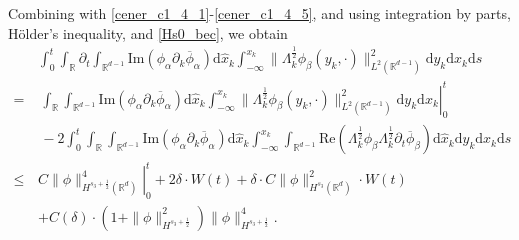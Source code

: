 \documentclass[10pt,twoside,a4paper]{article}
\numberwithin{equation}{section}\allowdisplaybreaks
\def\leq{\leqslant}
\begin{document}
Combining with \eqref{cener_c1_4_1}-\eqref{cener_c1_4_5}, and using integration by parts, Hölder's inequality, and \eqref{Hs0_bec}, we obtain
\begin{align} \label{cener_c1_4}
	&		 \int_0^t\int_{\mathbb{R}}  \partial_t\int_{\mathbb{R}^{d-1}}  \mathrm{Im}\left( \phi_{\alpha } \partial_k \overline{\phi}_\alpha \right) \mathrm{d} \hat{x}_k \int_{-\infty}^{x_k} \|\Lambda_k^{\frac 12}\phi_{\beta}(y_k,\cdot)\|^2_{L^2(\mathbb{R}^{d-1})}\mathrm{d} y_k  \mathrm{d} x_k \mathrm{d} s\nonumber\\
	=&\, \left. \int_{\mathbb{R}} \int_{\mathbb{R}^{d-1}}  \mathrm{Im}\left( \phi_{\alpha } \partial_k \overline{\phi}_\alpha \right) \mathrm{d} \hat{x}_k \int_{-\infty}^{x_k} \|\Lambda_k^{\frac 12}\phi_{\beta}(y_k,\cdot)\|^2_{L^2(\mathbb{R}^{d-1})}\mathrm{d} y_k  \mathrm{d} x_k \right|_{0}^t\nonumber\\
	&\,-2\int_0^t \int_{\mathbb{R}}  \int_{\mathbb{R}^{d-1}}  \mathrm{Im}\left( \phi_{\alpha } \partial_k \overline{\phi}_\alpha \right) \mathrm{d} \hat{x}_k \int_{-\infty}^{x_k} \int_{\mathbb{R}^{d-1}}  \mathrm{Re}\left( \Lambda_k^{\frac 12}\phi_{\beta}\Lambda_k^{\frac 12}\partial_t\overline{\phi}_{\beta }\right)\mathrm{d} \hat{x}_k \mathrm{d} y_k  \mathrm{d} x_k \mathrm{d} s\\
	\leq\,&  C\left. \|\phi\|^4_{H^{s_3+\frac 12}(\mathbb{R}^{d})}\right|_{0}^t+ 2\delta\cdot W (t)+\delta \cdot C\|\phi\|_{H^{s_3}(\mathbb{R}^d)}^2\cdot W (t)\nonumber\\
	& + C(\delta) \cdot\left(1+\|\phi\|_{H^{s_3+\frac 12}}^2\right)\|\phi\|_{H^{s_3+\frac 12}}^4.\nonumber
\end{align}
\end{document}
